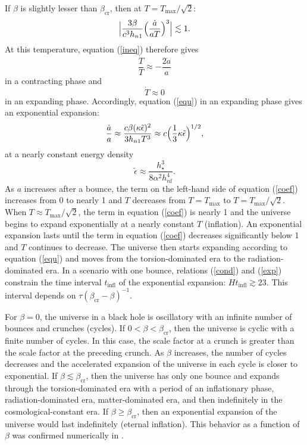 \documentclass[prd,onecolumn,nofootinbib]{revtex4}
\begin{document}
If $\beta$ is slightly lesser than $\beta_\textrm{cr}$, then at $T=T_\textrm{max}/\sqrt{2}$:
\begin{equation}
\Bigl|\frac{3\beta}{c^3 h_{n1}}\Bigl(\frac{\dot{a}}{aT}\Bigr)^3\Bigr|\lesssim 1.
\label{coef}
\end{equation}
At this temperature, equation (\ref{ineq}) therefore gives
\begin{equation}
\frac{\dot{T}}{T}\approx-\frac{2\dot{a}}{a}
\end{equation}
in a contracting phase and
\begin{equation}
\dot{T}\approx 0
\end{equation}
in an expanding phase.
Accordingly, equation (\ref{equ}) in an expanding phase gives an exponential expansion:
\begin{equation}
\frac{\dot{a}}{a}\approx\frac{c\beta(\kappa\tilde{\epsilon})^2}{3h_{n1}T^3}\approx c\Bigl(\frac{1}{3}\kappa\tilde{\epsilon}\Bigr)^{1/2},
\label{exp}
\end{equation}
at a nearly constant energy density
\begin{equation}
\tilde{\epsilon}\approx\frac{h_\star^3}{8\alpha^2 h_{n\textrm{f}}^4}.
\end{equation}
As $a$ increases after a bounce, the term on the left-hand side of equation (\ref{coef}) increases from 0 to nearly 1 and $T$ decreases from $T=T_\textrm{max}$ to $T=T_\textrm{max}/\sqrt{2}$.
When $T\approx T_\textrm{max}/\sqrt{2}$, the term in equation (\ref{coef}) is nearly 1 and the universe begins to expand exponentially at a nearly constant $T$ (inflation).
An exponential expansion lasts until the term in equation (\ref{coef}) decreases significantly below 1 and $T$ continues to decrease.
The universe then starts expanding according to equation (\ref{equ}) and moves from the torsion-dominated era to the radiation-dominated era.
In a scenario with one bounce, relations (\ref{cond}) and (\ref{exp}) constrain the time interval $t_\textrm{infl}$ of the exponential expansion: $Ht_\textrm{infl}\gtrsim 23$.
This interval depends on $\tau(\beta_\textrm{cr}-\beta)^{-1}$.

For $\beta=0$, the universe in a black hole is oscillatory with an infinite number of bounces and crunches (cycles).
If $0<\beta<\beta_\textrm{cr}$, then the universe is cyclic with a finite number of cycles.
In this case, the scale factor at a crunch is greater than the scale factor at the preceding crunch.
As $\beta$ increases, the number of cycles decreases and the accelerated expansion of the universe in each cycle is closer to exponential.
If $\beta\lesssim\beta_\textrm{cr}$, then the universe has only one bounce and expands through the torsion-dominated era with a period of an inflationary phase, radiation-dominated era, matter-dominated era, and then indefinitely in the cosmological-constant era.
If $\beta\ge\beta_\textrm{cr}$, then an exponential expansion of the universe would last indefinitely (eternal inflation).
This behavior as a function of $\beta$ was confirmed numerically in \cite{Sha}.\\
\end{document}
